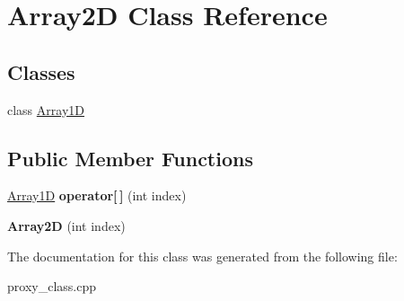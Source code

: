 \hypertarget{classArray2D}{}\section{Array2D Class Reference}
\label{classArray2D}
\subsection*{Classes}
\begin{DoxyCompactItemize}
\item 
class \hyperlink{classArray2D_1_1Array1D}{Array1D}
\end{DoxyCompactItemize}
\subsection*{Public Member Functions}
\begin{DoxyCompactItemize}
\item 
\hyperlink{classArray2D_1_1Array1D}{Array1D} {\bfseries operator\mbox{[}$\,$\mbox{]}} (int index)\hypertarget{classArray2D_a41287e3b69b11abdca4f73773a4854ce}{}\label{classArray2D_a41287e3b69b11abdca4f73773a4854ce}

\item 
{\bfseries Array2D} (int index)\hypertarget{classArray2D_a60b9b4ef448df9af79a732efae5aaaf3}{}\label{classArray2D_a60b9b4ef448df9af79a732efae5aaaf3}

\end{DoxyCompactItemize}


The documentation for this class was generated from the following file\+:\begin{DoxyCompactItemize}
\item 
proxy\+\_\+class.\+cpp\end{DoxyCompactItemize}
